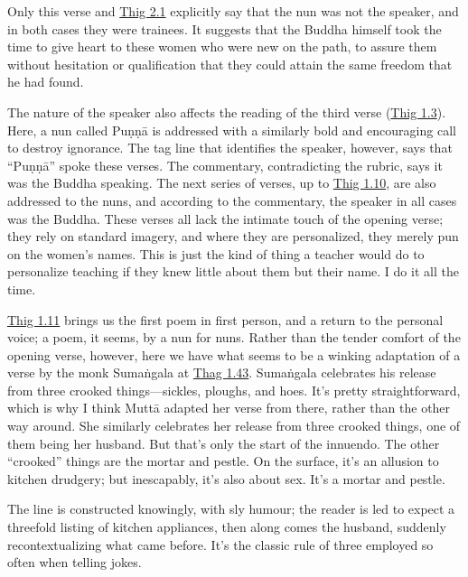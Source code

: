 \documentclass[12pt,openany]{book}%
\begin{document}
Only this verse and \href{https://suttacentral.net/thig2.1}{Thig 2.1} explicitly say that the nun was not the speaker, and in both cases they were trainees. It suggests that the Buddha himself took the time to give heart to these women who were new on the path, to assure them without hesitation or qualification that they could attain the same freedom that he had found.

The nature of the speaker also affects the reading of the third verse (\href{https://suttacentral.net/thig1.3}{Thig 1.3}). Here, a nun called \textsanskrit{Puṇṇā} is addressed with a similarly bold and encouraging call to destroy ignorance. The tag line that identifies the speaker, however, says that “\textsanskrit{Puṇṇā}” spoke these verses. The commentary, contradicting the rubric, says it was the Buddha speaking. The next series of verses, up to \href{https://suttacentral.net/thig1.10}{Thig 1.10}, are also addressed to the nuns, and according to the commentary, the speaker in all cases was the Buddha. These verses all lack the intimate touch of the opening verse; they rely on standard imagery, and where they are personalized, they merely pun on the women’s names. This is just the kind of thing a teacher would do to personalize teaching if they knew little about them but their name. I do it all the time.

\href{https://suttacentral.net/thig1.11}{Thig 1.11} brings us the first poem in first person, and a return to the personal voice; a poem, it seems, by a nun for nuns. Rather than the tender comfort of the opening verse, however, here we have what seems to be a winking adaptation of a verse by the monk \textsanskrit{Sumaṅgala} at \href{https://suttacentral.net/thag1.43/en/sujato}{Thag 1.43}. \textsanskrit{Sumaṅgala} celebrates his release from three crooked things—sickles, ploughs, and hoes. It’s pretty straightforward, which is why I think \textsanskrit{Muttā} adapted her verse from there, rather than the other way around. She similarly celebrates her release from three crooked things, one of them being her husband. But that’s only the start of the innuendo. The other “crooked” things are the mortar and pestle. On the surface, it’s an allusion to kitchen drudgery; but inescapably, it’s also about sex. It’s a mortar and pestle.

The line is constructed knowingly, with sly humour; the reader is led to expect a threefold listing of kitchen appliances, then along comes the husband, suddenly recontextualizing what came before. It’s the classic rule of three employed so often when telling jokes.
\end{document}
